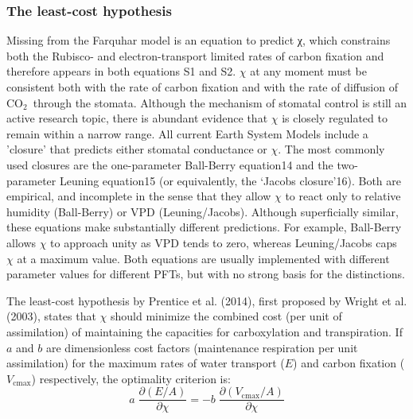 \documentclass{myreport}
\newcommand{\coo}{CO$_2$}
\begin{document}
\subsubsection{The least-cost hypothesis}
\label{sec:least-cost}
Missing from the Farquhar model is an equation to predict χ, which constrains both the Rubisco- and electron-transport limited rates of carbon fixation and therefore appears in both equations S1 and S2. 
$\chi$ at any moment must be consistent both with the rate of carbon fixation and with the rate of diffusion of \coo\ through the stomata. 
Although the mechanism of stomatal control is still an active research topic, there is abundant evidence that $\chi$ is closely regulated to remain within a narrow range. 
All current Earth System Models include a 'closure' that predicts either stomatal conductance or $\chi$. 
The most commonly used closures are the one-parameter Ball-Berry equation14 and the two-parameter Leuning equation15 (or equivalently, the ‘Jacobs closure’16). 
Both are empirical, and incomplete in the sense that they allow $\chi$ to react only to relative humidity (Ball-Berry) or VPD (Leuning/Jacobs). 
Although superficially similar, these equations make substantially different predictions. 
For example, Ball-Berry allows $\chi$ to approach unity as VPD tends to zero, whereas Leuning/Jacobs caps $\chi$ at a maximum value. 
Both equations are usually implemented with different parameter values for different PFTs, but with no strong basis for the distinctions.

The least-cost hypothesis by Prentice et al. (2014), first proposed by Wright et al. (2003), states that $\chi$ should minimize the combined cost (per unit of assimilation) of maintaining the capacities for carboxylation and transpiration. 
If $a$ and $b$ are dimensionless cost factors (maintenance respiration per unit assimilation) for the maximum rates of water transport ($E$) and carbon fixation ($V_{\mathrm{cmax}}$) respectively, the optimality criterion is:
\begin{equation}
    a \; \frac{\partial (E/A)}{\partial \chi} = -b \; \frac{\partial (V_{\mathrm{cmax}}/A)}{\partial \chi}
\end{equation}
\end{document}
